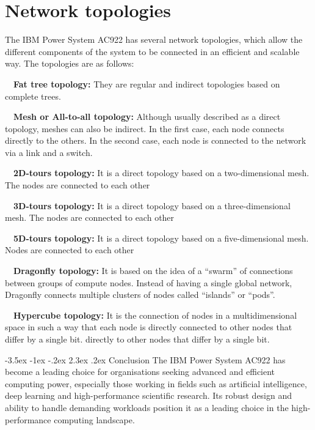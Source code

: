 \documentclass{report}
\makeatletter
\renewcommand\chapter{\@startsection{chapter}{0}{\z@}%
    {-3.5ex \@plus -1ex \@minus -.2ex}%
    {2.3ex \@plus.2ex}%
    {\normalfont\Large\bfseries}}
\makeatother
\begin{document}
\section{Network topologies}
\noindent The IBM Power System AC922 has several network topologies, which allow the different components of the system
to be connected in an efficient and scalable way. The topologies are as follows:

\CIRCLE \ \ \textbf{Fat tree topology:} They are regular and indirect topologies based on complete trees.

\CIRCLE \ \ \textbf{Mesh or All-to-all topology:} Although usually described as a direct topology, meshes can also be 
indirect. In the first case, each node connects directly to the others. In the second case, each node is connected to 
the network via a link and a switch.

\CIRCLE \ \ \textbf{2D-tours topology:} It is a direct topology based on a two-dimensional mesh. The nodes are connected to each other

\CIRCLE \ \ \textbf{3D-tours topology:} It is a direct topology based on a three-dimensional mesh. The nodes are connected to each other

\CIRCLE \ \ \textbf{5D-tours topology:} It is a direct topology based on a five-dimensional mesh. Nodes are connected to each other

\CIRCLE \ \ \textbf{Dragonfly topology:} It is based on the idea of a ``swarm'' of connections between groups of compute nodes. Instead 
of having a single global network, Dragonfly connects multiple clusters of nodes called ``islands'' or ``pods''.

\CIRCLE \ \ \textbf{Hypercube topology:} It is the connection of nodes in a multidimensional space in such a way that each node is directly
connected to other nodes that differ by a single bit. directly to other nodes that differ by a single bit.

\cleardoublepage

\chapter{Conclusion}
\noindent The IBM Power System AC922 has become a leading choice for organisations seeking advanced and efficient computing power, 
especially those working in fields such as artificial intelligence, deep learning and high-performance scientific research. Its 
robust design and ability to handle demanding workloads position it as a leading choice in the high-performance computing landscape.
\end{document}

